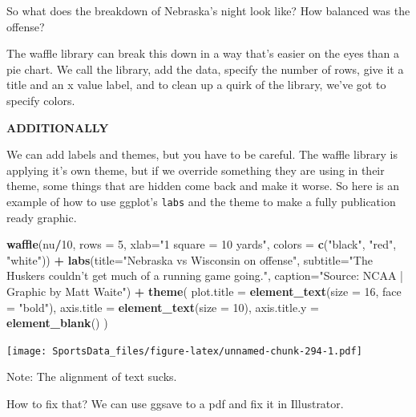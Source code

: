 \documentclass[
]{book}
\newenvironment{Shaded}{\begin{snugshade}}{\end{snugshade}}
\newcommand{\DataTypeTok}[1]{\textcolor[rgb]{0.13,0.29,0.53}{#1}}
\newcommand{\DecValTok}[1]{\textcolor[rgb]{0.00,0.00,0.81}{#1}}
\newcommand{\KeywordTok}[1]{\textcolor[rgb]{0.13,0.29,0.53}{\textbf{#1}}}
\newcommand{\NormalTok}[1]{#1}
\newcommand{\OperatorTok}[1]{\textcolor[rgb]{0.81,0.36,0.00}{\textbf{#1}}}
\newcommand{\StringTok}[1]{\textcolor[rgb]{0.31,0.60,0.02}{#1}}
\begin{document}
So what does the breakdown of Nebraska's night look like? How balanced was the offense?

The waffle library can break this down in a way that's easier on the eyes than a pie chart. We call the library, add the data, specify the number of rows, give it a title and an x value label, and to clean up a quirk of the library, we've got to specify colors.

\textbf{ADDITIONALLY}

We can add labels and themes, but you have to be careful. The waffle library is applying it's own theme, but if we override something they are using in their theme, some things that are hidden come back and make it worse. So here is an example of how to use ggplot's \texttt{labs} and the theme to make a fully publication ready graphic.

\begin{Shaded}
\begin{Highlighting}[]
\KeywordTok{waffle}\NormalTok{(nu}\OperatorTok{/}\DecValTok{10}\NormalTok{, }\DataTypeTok{rows =} \DecValTok{5}\NormalTok{, }\DataTypeTok{xlab=}\StringTok{"1 square = 10 yards"}\NormalTok{, }\DataTypeTok{colors =} \KeywordTok{c}\NormalTok{(}\StringTok{"black"}\NormalTok{, }\StringTok{"red"}\NormalTok{, }\StringTok{"white"}\NormalTok{)) }\OperatorTok{+}\StringTok{ }\KeywordTok{labs}\NormalTok{(}\DataTypeTok{title=}\StringTok{"Nebraska vs Wisconsin on offense"}\NormalTok{, }\DataTypeTok{subtitle=}\StringTok{"The Huskers couldn't get much of a running game going."}\NormalTok{, }\DataTypeTok{caption=}\StringTok{"Source: NCAA | Graphic by Matt Waite"}\NormalTok{) }\OperatorTok{+}\StringTok{ }
\StringTok{  }\KeywordTok{theme}\NormalTok{(}
    \DataTypeTok{plot.title =} \KeywordTok{element_text}\NormalTok{(}\DataTypeTok{size =} \DecValTok{16}\NormalTok{, }\DataTypeTok{face =} \StringTok{"bold"}\NormalTok{),}
    \DataTypeTok{axis.title =} \KeywordTok{element_text}\NormalTok{(}\DataTypeTok{size =} \DecValTok{10}\NormalTok{),}
    \DataTypeTok{axis.title.y =} \KeywordTok{element_blank}\NormalTok{()}
\NormalTok{  )}
\end{Highlighting}
\end{Shaded}

\texttt{[image: SportsData\_files/figure-latex/unnamed-chunk-294-1.pdf]}

Note: The alignment of text sucks.

How to fix that? We can use ggsave to a pdf and fix it in Illustrator.
\end{document}
